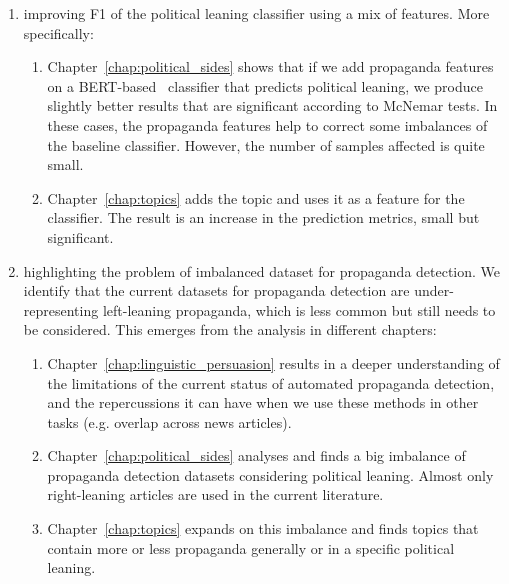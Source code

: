 \begin{enumerate}
\begin{enumerate}
    \end{enumerate}
    \item improving F1 of the political leaning classifier using a mix of features. More specifically:
    \begin{enumerate}
        \item Chapter~\ref{chap:political_sides}  shows that if we add propaganda features on a BERT-based~\citep{devlin2018bert} classifier that predicts political leaning, we produce slightly better results that are significant according to McNemar tests. In these cases, the propaganda features help to correct some imbalances of the baseline classifier. However, the number of samples affected is quite small.
        \item Chapter~\ref{chap:topics} adds the topic and uses it as a feature for the classifier. The result is an increase in the prediction metrics, small but significant.
    \end{enumerate}
    \item highlighting the problem of imbalanced dataset for propaganda detection.
    We identify that the current datasets for propaganda detection are under-representing left-leaning propaganda, which is less common but still needs to be considered.
    This emerges from the analysis in different chapters:
    \begin{enumerate}
        \item Chapter~\ref{chap:linguistic_persuasion} results in a deeper understanding of the limitations of the current status of automated propaganda detection, and the repercussions it can have when we use these methods in other tasks (e.g. overlap across news articles).
        \item Chapter~\ref{chap:political_sides} analyses and finds a big imbalance of propaganda detection datasets considering political leaning. Almost only right-leaning articles are used in the current literature.
        \item Chapter~\ref{chap:topics} expands on this imbalance and finds topics that contain more or less propaganda generally or in a specific political leaning.
    \end{enumerate}


\end{enumerate}
